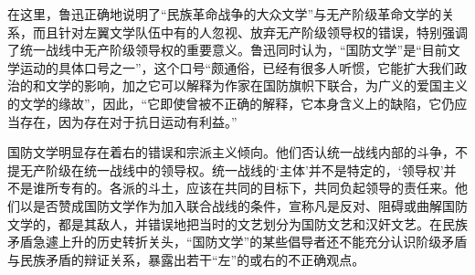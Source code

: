 \begin{maonote}
在这里，鲁迅正确地说明了“民族革命战争的大众文学”与无产阶级革命文学的关系，而且针对左翼文学队伍中有的人忽视、放弃无产阶级领导权的错误，特别强调了统一战线中无产阶级领导权的重要意义。鲁迅同时认为，“国防文学”是“目前文学运动的具体口号之一”，这个口号“颇通俗，已经有很多人听惯，它能扩大我们政治的和文学的影响，加之它可以解释为作家在国防旗帜下联合，为广义的爱国主义的文学的缘故”，因此，“它即使曾被不正确的解释，它本身含义上的缺陷，它仍应当存在，因为存在对于抗日运动有利益。”

国防文学明显存在着右的错误和宗派主义倾向。他们否认统一战线内部的斗争，不提无产阶级在统一战线中的领导权。统一战线的‘主体’并不是特定的，‘领导权’并不是谁所专有的。各派的斗土，应该在共同的目标下，共同负起领导的责任来。他们以是否赞成国防文学作为加入联合战线的条件，宣称凡是反对、阻碍或曲解国防文学的，都是其敌人，并错误地把当时的文艺划分为国防文艺和汉奸文艺。在民族矛盾急遽上升的历史转折关头，“国防文学”的某些倡导者还不能充分认识阶级矛盾与民族矛盾的辩证关系，暴露出若干“左”的或右的不正确观点。


\end{maonote}
